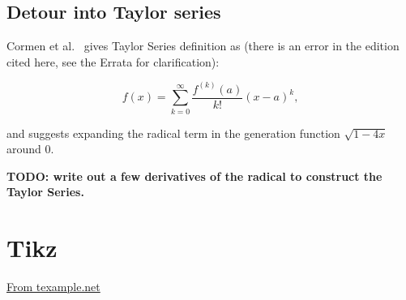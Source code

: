 \documentclass{article}
\begin{document}
\subsection{Detour into Taylor series}

Cormen et al.~\cite[p. 262]{cormen:th:1990} gives Taylor Series definition as
(there is an error in the edition cited here, see the Errata for clarification):

\begin{equation}
f(x) = \sum_{k=0}^{\infty} \frac{f^{(k)}(a)}{k!}(x-a)^k,
\end{equation}

and suggests expanding the radical term in the generation function
$\sqrt{1-4x}$ around $0$.

{\bf TODO: write out a few derivatives of the radical to construct
the Taylor Series.}

\section{Tikz}





\href{http://www.texample.net/tikz/examples/merge-sort-recursion-tree/}{From texample.net}
\end{document}
